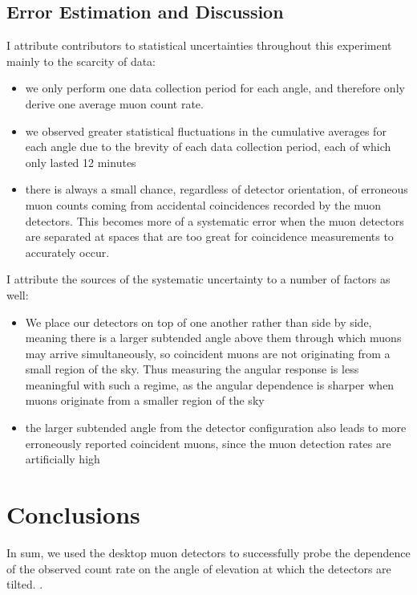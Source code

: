 \documentclass[aps,twocolumn,secnumarabic,balancelastpage,amsmath,amssymb,nofootinbib, floatfix]{revtex4-2}
\begin{document}
	\subsection{Error Estimation and Discussion}
	I attribute contributors to statistical uncertainties throughout this experiment mainly to the scarcity of data:
	\begin{itemize}
		\item we only perform one data collection period for each angle, and therefore only derive one average muon count rate. 
		\item we observed greater statistical fluctuations in the cumulative averages for each angle due to the brevity of each data collection period, each of which only lasted 12 minutes
		\item there is always a small chance, regardless of detector orientation, of erroneous muon counts coming from accidental coincidences recorded by the muon detectors. This becomes more of a systematic error when the muon detectors are separated at spaces that are too great for coincidence measurements to accurately occur.
	\end{itemize}
	
	I attribute the sources of the systematic uncertainty to a number of factors as well:
	\begin{itemize}
		\item We place our detectors on top of one another rather than side by side, meaning there is a larger subtended angle above them through which muons may arrive simultaneously, so coincident muons are not originating from a small region of the sky. Thus measuring the angular response is less meaningful with such a regime, as the angular dependence is sharper when muons originate from a smaller region of the sky
		\item the larger subtended angle from the detector configuration also leads  to more erroneously reported coincident muons, since the muon detection rates are artificially high 
	\end{itemize}  
	
	
	\section{Conclusions}
	In sum, we used the desktop muon detectors to successfully probe the dependence of the observed count rate on the angle of elevation at which the detectors are tilted. .
	
\end{document}
